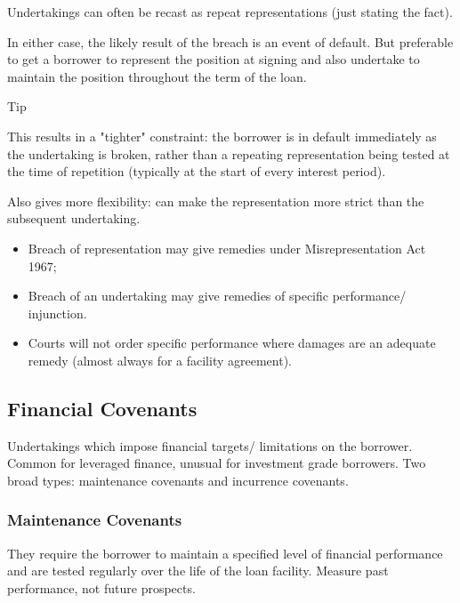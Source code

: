 \documentclass[
]{article}
\providecommand{\tightlist}{%
  \setlength{\itemsep}{0pt}\setlength{\parskip}{0pt}}
\newenvironment{env-a0fe8824-15a9-47d5-bf01-f54598533eae}
{
    \savenotes\tcolorbox[blanker,breakable,left=5pt,borderline west={2pt}{-4pt}{cyan}]
}
{
    \endtcolorbox\spewnotes
}
\begin{document}
Undertakings can often be recast as repeat representations (just stating
the fact).

In either case, the likely result of the breach is an event of default.
But preferable to get a borrower to represent the position at signing
and also undertake to maintain the position throughout the term of the
loan.

\begin{env-a0fe8824-15a9-47d5-bf01-f54598533eae}

Tip

This results in a "tighter" constraint: the borrower is in default
immediately as the undertaking is broken, rather than a repeating
representation being tested at the time of repetition (typically at the
start of every interest period).

\end{env-a0fe8824-15a9-47d5-bf01-f54598533eae}

Also gives more flexibility: can make the representation more strict
than the subsequent undertaking.

\begin{itemize}
\tightlist
\item
  Breach of representation may give remedies under Misrepresentation Act
  1967;
\item
  Breach of an undertaking may give remedies of specific performance/
  injunction.
\item
  Courts will not order specific performance where damages are an
  adequate remedy (almost always for a facility agreement).
\end{itemize}

\hypertarget{financial-covenants}{%
\subsection{Financial Covenants}\label{financial-covenants}}

Undertakings which impose financial targets/ limitations on the
borrower. Common for leveraged finance, unusual for investment grade
borrowers. Two broad types: maintenance covenants and incurrence
covenants.

\hypertarget{maintenance-covenants}{%
\subsubsection{Maintenance Covenants}\label{maintenance-covenants}}

They require the borrower to maintain a specified level of financial
performance and are tested regularly over the life of the loan facility.
Measure past performance, not future prospects.
\end{document}
